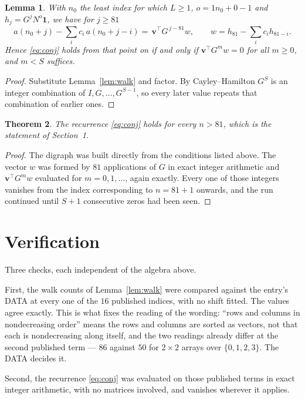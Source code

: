 \documentclass[11pt,a4paper]{article}
\theoremstyle{plain}
\newtheorem{theorem}{Theorem}
\newtheorem{lemma}[theorem]{Lemma}
\theoremstyle{definition}
\begin{document}
\begin{lemma}\label{lem:crit}
With $n_0$ the least index for which $L\ge1$, $o=1n_0+0-1$ and
$h_j=G^{j}N^{o}\mathbf{1}$, we have for $j\ge81$
\[
a(n_0+j)-\sum_i c_i\,a(n_0+j-i)=\,\mathbf{v}^{\!\top}G^{\,j-81}w,
\qquad w=h_{81}-\sum_i c_ih_{81-i} .
\]
Hence \eqref{eq:conj} holds from that point on if and only if
$\mathbf{v}^{\!\top}G^{m}w=0$ for all $m\ge0$, and $m<S$ suffices.
\end{lemma}

\begin{proof}
Substitute Lemma~\ref{lem:walk} and factor. By Cayley--Hamilton $G^{S}$ is an integer
combination of $I,G,\dots,G^{S-1}$, so every later value repeats that combination of
earlier ones.
\end{proof}

\begin{theorem}
The recurrence \eqref{eq:conj} holds for every $n>81$, which is the statement of
Section~1.
\end{theorem}

\begin{proof}
The digraph was built directly from the conditions listed above. The vector $w$ was formed by
$81$ applications of $G$ in exact integer arithmetic and $\mathbf{v}^{\!\top}G^{m}w$
evaluated for $m=0,1,\dots$, again exactly. Every one of those integers vanishes from the
index corresponding to $n=81+1$ onwards, and the run continued until $S+1$ consecutive
zeros had been seen.
\end{proof}

\section{Verification}

Three checks, each independent of the algebra above.

First, the walk counts of Lemma~\ref{lem:walk} were compared against the entry's DATA at
every one of the $16$ published indices, with no shift fitted. The values agree exactly.
This is what fixes the reading of the wording: ``rows and columns in nondecreasing order''
means the rows and columns are sorted as vectors, not that each is nondecreasing along
itself, and the two readings already differ at the second published term --- $86$ against
$50$ for $2\times2$ arrays over $\{0,1,2,3\}$. The DATA decides it.

Second, the recurrence \eqref{eq:conj} was evaluated on those published terms in exact
integer arithmetic, with no matrices involved, and vanishes wherever it applies.
\end{document}
